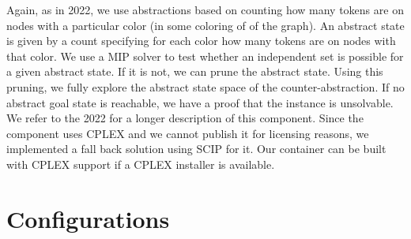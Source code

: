 \documentclass{article}
\renewcommand{\todo}[1]{} %
\begin{document}
Again, as in 2022, we use abstractions based on counting how many tokens are on nodes with a particular color (in some coloring of of the graph). An abstract state is given by a count specifying for each color how many tokens are on nodes with that color. We use a MIP solver to test whether an independent set is possible for a given abstract state. If it is not, we can prune the abstract state. Using this pruning, we fully explore the abstract state space of the counter-abstraction. If no abstract goal state is reachable, we have a proof that the instance is unsolvable. We refer to the 2022 for a longer description of this component. Since the component uses CPLEX \cite{cplex} and we cannot publish it for licensing reasons, we implemented a fall back solution using SCIP \cite{scip} for it. Our container can be built with CPLEX support if a CPLEX installer is available.

\todo{\begin{itemize}
    \item As in 2022, we use abstractions based on counting how many tokens are
        on nodes with a particular color (in some coloring of of the graph). An
        abstract state is given by a count specifying for each color how many tokens are on nodes with that
        color. We use a MIP solver to test whether an independent set is
        possible for a given abstract state. If it is not, we can prune the
        abstract state. Using this pruning, we fully explore the abstract state
        space of the counter-abstraction. If no abstract goal state is
        reachable, we have a proof that the instance is unsolvable.
    \item We refer to the 2022 for a longer description of this component.
    \item Since the component uses CPLEX \cite{cplex} and we cannot publish it
    for licensing reasons, we implemented a fall back solution using SCIP
    \cite{scip} for it. Our container can be built with CPLEX support if an
    CPLEX installer is available during build time.

\end{itemize}}


\section{Configurations}
\end{document}
